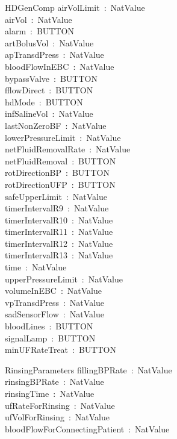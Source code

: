 \begin{schema}{HDGenComp}
    airVolLimit~:~NatValue\\
    airVol~:~NatValue\\
    alarm~:~BUTTON\\
    artBolusVol~:~NatValue\\
    apTransdPress~:~NatValue\\
    bloodFlowInEBC~:~NatValue\\
    bypassValve~:~BUTTON\\
    fflowDirect~:~BUTTON\\
    hdMode~:~BUTTON\\
    infSalineVol~:~NatValue\\
    lastNonZeroBF~:~NatValue\\
    lowerPressureLimit~:~NatValue\\
    netFluidRemovalRate~:~NatValue\\
    netFluidRemoval~:~BUTTON\\
    rotDirectionBP~:~BUTTON\\
    rotDirectionUFP~:~BUTTON~\\
    safeUpperLimit~:~NatValue\\
    timerIntervalR9~:~NatValue\\
    timerIntervalR10~:~NatValue\\
    timerIntervalR11~:~NatValue\\
    timerIntervalR12~:~NatValue\\
    timerIntervalR13~:~NatValue\\
    time~:~NatValue\\
    upperPressureLimit~:~NatValue\\
    volumeInEBC~:~NatValue\\
    vpTransdPress~:~NatValue\\
    sadSensorFlow~:~NatValue\\
    bloodLines~:~BUTTON\\
    signalLamp~:~BUTTON\\
    minUFRateTreat~:~BUTTON
\end{schema}
\begin{schema}{RinsingParameters}
    fillingBPRate~:~NatValue\\
    rinsingBPRate~:~NatValue\\
    rinsingTime~:~NatValue\\
    ufRateForRinsing~:~NatValue\\
    ufVolForRinsing~:~NatValue\\
    bloodFlowForConnectingPatient~:~NatValue
\end{schema}
